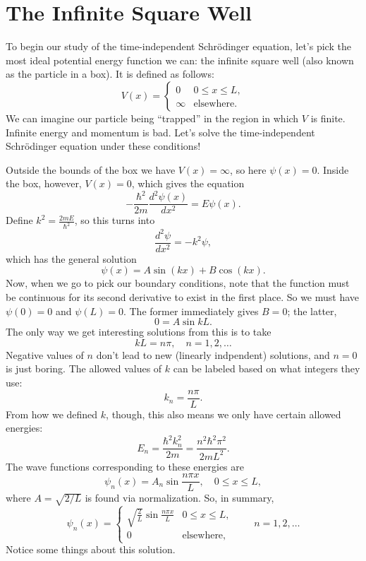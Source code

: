 \documentclass[../p052main.tex]{subfiles}
\begin{document}
\section{The Infinite Square Well}
To begin our study of the time-independent Schrödinger equation, let's pick the most ideal potential energy function we can: the infinite square well (also known as the particle in a box).
It is defined as follows:
\[ V(x) = \begin{cases} 0 & 0 \leq x \leq L, \\ \infty & \text{elsewhere}. \end{cases} \]
We can imagine our particle being ``trapped'' in the region in which $V$ is finite.
Infinite energy and momentum is bad.
Let's solve the time-independent Schrödinger equation under these conditions!

Outside the bounds of the box we have $V(x) = \infty$, so here $\psi(x) = 0$.
Inside the box, however, $V(x) = 0$, which gives the equation
\[ -\frac{\hbar^2}{2m} \frac{d^2 \psi(x)}{dx^2} = E \psi (x). \]
Define $k^2 = \frac{2mE}{\hbar^2}$, so this turns into
\[ \frac{d^2 \psi}{dx^2} = -k^2 \psi, \]
which has the general solution
\[ \psi(x) = A \sin (kx) + B \cos (kx). \]
Now, when we go to pick our boundary conditions, note that the function must be continuous for its second derivative to exist in the first place.
So we must have $\psi(0) = 0$ and $\psi(L) = 0$.
The former immediately gives $B = 0$; the latter,
\[ 0 = A \sin kL. \]
The only way we get interesting solutions from this is to take
\[ kL = n \pi, \quad n = 1, 2, \ldots \]
Negative values of $n$ don't lead to new (linearly indpendent) solutions, and $n = 0$ is just boring.
The allowed values of $k$ can be labeled based on what integers they use:
\[ k_n = \frac{n \pi}{L}. \]
From how we defined $k$, though, this also means we only have certain allowed energies:
\[ E_n = \frac{\hbar^2 k_n^2}{2m} = \frac{n^2 \hbar^2 \pi^2}{2mL^2}. \]
The wave functions corresponding to these energies are
\[ \psi_n(x) = A_n \sin \frac{n \pi x}{L}, \quad 0 \leq x \leq L, \]
where $A = \sqrt{2/L}$ is found via normalization.
So, in summary,
\[ \psi_n(x) = \begin{cases} \sqrt{\frac{2}{L}} \sin \frac{n \pi x}{L} & 0 \leq x \leq L, \\ 0 & \text{elsewhere}, \end{cases} \qquad n = 1, 2, \ldots \]
Notice some things about this solution.
\end{document}
